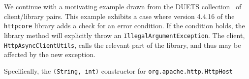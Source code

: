 We continue with a motivating example drawn from the DUETS collection~\cite{DUETS}
of client/library pairs. 
This example exhibits a case
where version 4.4.16 of the \texttt{httpcore} library adds a check for an
error condition.  If the condition holds, the library method will
explicitly throw an \texttt{IllegalArgumentException}. The client, \texttt{HttpAsyncClientUtils},
calls the relevant part of the library, and thus may be affected by the new exception.

Specifically, the \texttt{(String, int)} constructor for \texttt{org.apache.http.HttpHost} 
